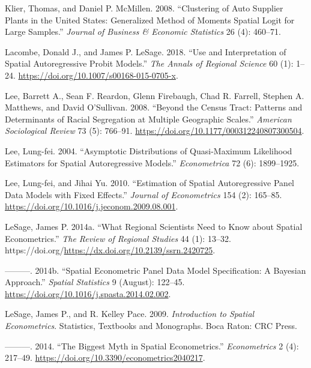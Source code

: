 \documentclass[
  letterpaper,
]{scrbook}
\newlength{\cslhangindent}
\newlength{\cslentryspacingunit} %
\newenvironment{CSLReferences}[2] %
 {%
  \setlength{\parindent}{0pt}
  \ifodd #1
  \let\oldpar\par
  \def\par{\hangindent=\cslhangindent\oldpar}
  \fi
  \setlength{\parskip}{#2\cslentryspacingunit}
 }%
 {}
\begin{document}
\begin{CSLReferences}{1}{0}
\leavevmode{}%
Klier, Thomas, and Daniel P. McMillen. 2008. {``Clustering of {Auto
Supplier Plants} in the {United States}: {Generalized Method} of
{Moments Spatial Logit} for {Large Samples}.''} \emph{Journal of
Business \& Economic Statistics} 26 (4): 460--71.

\leavevmode{}%
Lacombe, Donald J., and James P. LeSage. 2018. {``Use and Interpretation
of Spatial Autoregressive Probit Models.''} \emph{The Annals of Regional
Science} 60 (1): 1--24. \url{https://doi.org/10.1007/s00168-015-0705-x}.

\leavevmode{}%
Lee, Barrett A., Sean F. Reardon, Glenn Firebaugh, Chad R. Farrell,
Stephen A. Matthews, and David O'Sullivan. 2008. {``Beyond the {Census
Tract}: {Patterns} and {Determinants} of {Racial Segregation} at
{Multiple Geographic Scales}.''} \emph{American Sociological Review} 73
(5): 766--91. \url{https://doi.org/10.1177/000312240807300504}.

\leavevmode{}%
Lee, Lung-fei. 2004. {``Asymptotic {Distributions} of {Quasi-Maximum
Likelihood Estimators} for {Spatial Autoregressive Models}.''}
\emph{Econometrica} 72 (6): 1899--1925.

\leavevmode{}%
Lee, Lung-fei, and Jihai Yu. 2010. {``Estimation of {Spatial
Autoregressive Panel Data Models} with {Fixed Effects}.''} \emph{Journal
of Econometrics} 154 (2): 165--85.
\url{https://doi.org/10.1016/j.jeconom.2009.08.001}.

\leavevmode{}%
LeSage, James P. 2014a. {``What {Regional Scientists Need} to {Know}
about {Spatial Econometrics}.''} \emph{The Review of Regional Studies}
44 (1): 13--32.
https://doi.org/\url{https://dx.doi.org/10.2139/ssrn.2420725}.

\leavevmode{}%
---------. 2014b. {``Spatial Econometric Panel Data Model Specification:
{A Bayesian} Approach.''} \emph{Spatial Statistics} 9 (August): 122--45.
\url{https://doi.org/10.1016/j.spasta.2014.02.002}.

\leavevmode{}%
LeSage, James P., and R. Kelley Pace. 2009. \emph{Introduction to
{Spatial Econometrics}}. Statistics, {Textbooks} and {Monographs}. {Boca
Raton}: {CRC Press}.

\leavevmode{}%
---------. 2014. {``The {Biggest Myth} in {Spatial Econometrics}.''}
\emph{Econometrics} 2 (4): 217--49.
\url{https://doi.org/10.3390/econometrics2040217}.


\end{CSLReferences}
\end{document}
